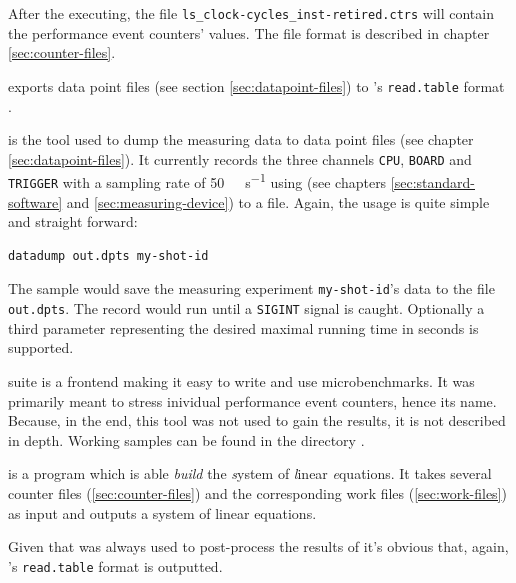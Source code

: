 After the executing, the file \texttt{ls\_clock-cycles\_inst-retired.ctrs} will
contain the performance event counters' values. The file format is described in
chapter \ref{sec:counter-files}.


\JWlfour{\JWTde}

\JWTde{} exports data point files (see section \ref{sec:datapoint-files}) to
\JWTR's \texttt{read.table} format \cite{r11data}.


\JWlfour{\JWTdd}

\JWTdd{} is the tool used to dump the measuring data to data point files (see
chapter \ref{sec:datapoint-files}). It currently records the three channels
\texttt{CPU}, \texttt{BOARD} and \texttt{TRIGGER} with a sampling rate of
\SI{50}{\kilo\samples\per\second} using \JWTnidaqmxbase{} (see chapters
\ref{sec:standard-software} and \ref{sec:measuring-device}) to a file.
Again, the usage is quite simple and straight forward:

\begin{lstlisting}[style=Shell]
datadump out.dpts my-shot-id
\end{lstlisting}

The sample would save the measuring experiment \texttt{my-shot-id}'s data to the
file \texttt{out.dpts}. The record would run until a \texttt{SIGINT} signal is
caught. Optionally a third parameter representing the desired maximal running
time in seconds is supported.



\JWTcbs{} suite is a frontend making it easy to write and use
microbenchmarks.  It was primarily meant to stress inividual performance event
counters, hence its name. Because, in the end, this tool was not used to
gain the results, it is not described in depth. Working samples can be found in
the directory .


\JWlfour{\JWTbsle}

\JWTbsle{} is a  program which is able
\emph{build} the \emph{s}ystem of \emph{l}inear \emph{e}quations. It takes
several counter files (\ref{sec:counter-files}) and the corresponding work files
(\ref{sec:work-files}) as input and outputs a system of linear equations.

Given that \JWTR{} was always used to post-process the results of \JWTbsle{}
it's obvious that, again, \JWTR's \texttt{read.table} \cite{r11data} format is
outputted.



